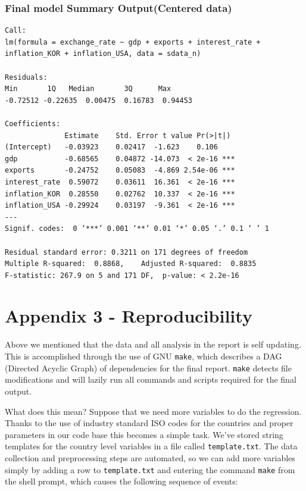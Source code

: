 \documentclass[12pt]{article}
\begin{document}
\subsubsection{Final model Summary Output(Centered data)}
\label{centered}

\begin{verbatim}
Call:
lm(formula = exchange_rate ~ gdp + exports + interest_rate + 
inflation_KOR + inflation_USA, data = sdata_n)

Residuals:
Min       1Q   Median       3Q      Max 
-0.72512 -0.22635  0.00475  0.16783  0.94453 

Coefficients:
              Estimate    Std. Error t value Pr(>|t|)    
(Intercept)   -0.03923    0.02417  -1.623    0.106    
gdp           -0.68565    0.04872 -14.073  < 2e-16 ***
exports       -0.24752    0.05083  -4.869 2.54e-06 ***
interest_rate  0.59072    0.03611  16.361  < 2e-16 ***
inflation_KOR  0.28550    0.02762  10.337  < 2e-16 ***
inflation_USA -0.29924    0.03197  -9.361  < 2e-16 ***
---
Signif. codes:  0 ‘***’ 0.001 ‘**’ 0.01 ‘*’ 0.05 ‘.’ 0.1 ‘ ’ 1

Residual standard error: 0.3211 on 171 degrees of freedom
Multiple R-squared:  0.8868,	Adjusted R-squared:  0.8835 
F-statistic: 267.9 on 5 and 171 DF,  p-value: < 2.2e-16
\end{verbatim}

\section{Appendix 3 - Reproducibility}

Above we mentioned that the data and all analysis in the report is self 
updating. This is accomplished through the use of GNU \texttt{make}, which
describes a DAG (Directed Acyclic Graph) of dependencies for the final
report. \texttt{make} detects file modifications and will lazily run all
commands and scripts required for the final output.

What does this mean? Suppose that we need more variables to do the
regression. Thanks to the use
of industry standard ISO codes for the countries and proper parameters in
our code base this becomes a simple task.
We've stored string templates for the country level 
variables in a file
called \texttt{template.txt}. The data collection and preprocessing steps
are automated, so we can add more variables simply by adding a row to
\texttt{template.txt} and entering the command \texttt{make} from the shell
prompt, which causes the following sequence of events: 
\end{document}
